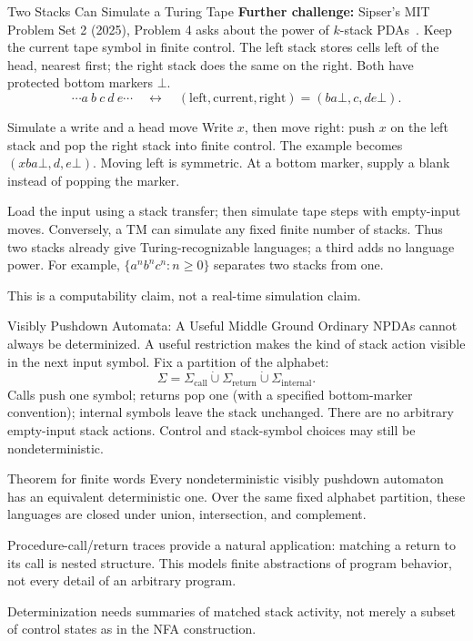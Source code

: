 \documentclass[10pt]{beamer}
\begin{document}
\begin{frame}{Two Stacks Can Simulate a Turing Tape}
  \small
  \textbf{Further challenge:} Sipser's MIT Problem Set 2 (2025), Problem 4
  asks about the power of $k$-stack PDAs~\cite{sipser-two-stacks}.
  \pause
  Keep the current tape symbol in finite control. The left stack stores
  cells left of the head, nearest first; the right stack does the same on
  the right. Both have protected bottom markers $\bot$.
  \[
    \cdots a\ b\ \boxed{c}\ d\ e\cdots
    \quad\longleftrightarrow\quad
    (\text{left},\text{current},\text{right})=(ba\bot,c,de\bot).
  \]
  \begin{block}{Simulate a write and a head move}
    Write $x$, then move right: push $x$ on the left stack and pop the
    right stack into finite control. The example becomes
    $(xba\bot,d,e\bot)$. Moving left is symmetric.
    At a bottom marker, supply a blank instead of popping the marker.
  \end{block}
  \pause
  Load the input using a stack transfer; then simulate tape steps with
  empty-input moves. Conversely, a TM can simulate any fixed finite number
  of stacks. Thus two stacks already give Turing-recognizable languages;
  a third adds no language power. For example, $\{a^nb^nc^n:n\ge0\}$
  separates two stacks from one.
  \par\smallskip
  This is a computability claim, not a real-time simulation claim.
\end{frame}

\begin{frame}{Visibly Pushdown Automata: A Useful Middle Ground}
  \small
  Ordinary NPDAs cannot always be determinized. A useful restriction makes
  the kind of stack action visible in the next input symbol.
  Fix a partition of the alphabet:
  \[
    \Sigma=\Sigma_{\mathrm{call}}\mathbin{\dot\cup}
      \Sigma_{\mathrm{return}}\mathbin{\dot\cup}\Sigma_{\mathrm{internal}}.
  \]
  Calls push one symbol; returns pop one (with a specified bottom-marker
  convention); internal symbols leave the stack unchanged. There are no
  arbitrary empty-input stack actions. Control and stack-symbol choices
  may still be nondeterministic.
  \pause
  \begin{block}{Theorem for finite words \cite{visibly-pushdown}}
    Every nondeterministic visibly pushdown automaton has an equivalent
    deterministic one. Over the same fixed alphabet partition, these
    languages are closed under union, intersection, and complement.
  \end{block}
  \pause
  Procedure-call/return traces provide a natural application: matching a
  return to its call is nested structure. This models finite abstractions
  of program behavior, not every detail of an arbitrary program.
  \par\smallskip
  Determinization needs summaries of matched stack activity, not merely
  a subset of control states as in the NFA construction.
\end{frame}
\end{document}
